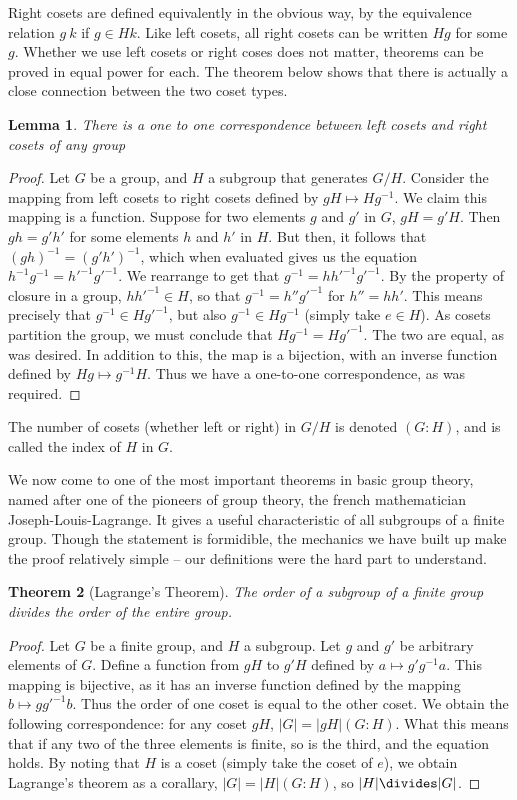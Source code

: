 \documentclass[12pt]{report}
\newtheorem{theorem}{Theorem}[section]
\newtheorem{lemma}[theorem]{Lemma}
\begin{document}
Right cosets are defined equivalently in the obvious way, by the equivalence relation $g ~ k$ if $g \in Hk$. Like left cosets, all right cosets can be written $Hg$ for some $g$. Whether we use left cosets or right coses does not matter, theorems can be proved in equal power for each. The theorem below shows that there is actually a close connection between the two coset types.

\begin{lemma} There is a one to one correspondence between left cosets and right cosets of any group \end{lemma}
\begin{proof}
Let $G$ be a group, and $H$ a subgroup that generates $G/H$. Consider the mapping from left cosets to right cosets defined by $gH \mapsto Hg^{-1}$. We claim this mapping is a function. Suppose for two elements $g$ and $g'$ in $G$, $gH = g'H$. Then $gh = g'h'$ for some elements $h$ and $h'$ in $H$. But then, it follows that $(gh)^{-1} = (g'h')^{-1}$, which when evaluated gives us the equation $h^{-1}g^{-1} = h'^{-1}g'^{-1}$. We rearrange to get that $g^{-1} = hh'^{-1}g'^{-1}$. By the property of closure in a group, $hh'^{-1} \in H$, so that $g^{-1} = h''g'^{-1}$ for $h'' = hh'$. This means precisely that $g^{-1} \in Hg'^{-1}$, but also $g^{-1} \in Hg^{-1}$ (simply take $e \in H$). As cosets partition the group, we must conclude that $Hg^{-1} = Hg'^{-1}$. The two are equal, as was desired. In addition to this, the map is a bijection, with an inverse function defined by $Hg \mapsto g^{-1}H$. Thus we have a one-to-one correspondence, as was required.
\end{proof}

The number of cosets (whether left or right) in $G/H$ is denoted $(G:H)$, and is called the index of $H$ in $G$.

We now come to one of the most important theorems in basic group theory, named after one of the pioneers of group theory, the french mathematician Joseph-Louis-Lagrange. It gives a useful characteristic of all subgroups of a finite group. Though the statement is formidible, the mechanics we have built up make the proof relatively simple -- our definitions were the hard part to understand.

\begin{theorem}[Lagrange's Theorem]
    The order of a subgroup of a finite group divides the order of the entire group.
\end{theorem}
\begin{proof}
Let $G$ be a finite group, and $H$ a subgroup. Let $g$ and $g'$ be arbitrary elements of $G$. Define a function from $gH$ to $g'H$ defined by $a \mapsto g'g^{-1}a$. This mapping is bijective, as it has an inverse function defined by the mapping $b \mapsto gg'^{-1}b$. Thus the order of one coset is equal to the other coset. We obtain the following correspondence: for any coset $gH$, $|G| = |gH|(G:H)$. What this means that if any two of the three elements is finite, so is the third, and the equation holds. By noting that $H$ is a coset (simply take the coset of $e$), we obtain Lagrange's theorem as a corallary, $|G| = |H|(G:H)$, so $|H| \divides |G|$.
\end{proof}
\end{document}

